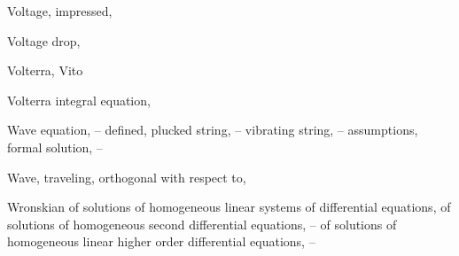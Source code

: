 \begin{theindex}
  \item Voltage, impressed, \pageref{exer:6.2.26}

  \item Voltage drop, \pageref{eq:6.3.1}

  \item Volterra, Vito \pageref{eq:8.6.11}

  \item Volterra integral equation, \pageref{eq:8.6.11} 

  \item Wave equation, \pageref{eq:12.2.1}--\pageref{exer:12.2.68}
    \subitem defined, \pageref{eq:12.2.1}
    \subitem plucked string, \pageref{eq:12.2.19}--\pageref{exer:12.2.1}
    \subitem vibrating string, \pageref{eq:12.2.1}--\pageref{example:12.2.1}
      \subsubitem assumptions, \pageref{eq:12.2.1}
      \subsubitem formal solution, \pageref{eq:12.2.5}--\pageref{example:12.2.1}

  \item Wave, traveling, \pageref{eq:12.2.23}
    \subitem orthogonal with respect to, \pageref{eq:11.2.7} \pageref{exer:7.2.30}

  \item Wronskian
    \subitem of solutions of homogeneous linear systems of differential equations, \pageref{thmtype:10.3.2}
    \subitem of solutions of homogeneous second differential equations, \pageref{eq:5.1.21}--\pageref{example:5.1.5}
    \subitem of solutions of homogeneous linear higher order differential equations, \pageref{eq:9.1.13}--\pageref{thmtype:9.1.5}
\end{theindex}
